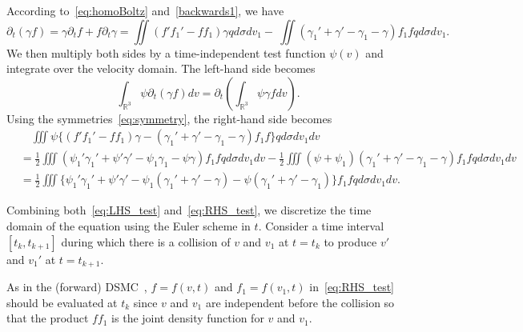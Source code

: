 \documentclass[times,final,nopreprintline]{elsarticle}
\newcommand{\bbR}{\mathbb R} \newcommand{\bbS}{\mathbb S}
\newcommand{\Rthree}{{\bbR^3}}
\begin{document}
According to~\eqref{eq:homoBoltz} and~\eqref{backwards1}, we have
\begin{equation*}
\partial_t (\gamma f) = \gamma \partial_t f + f \partial_t \gamma = \iint(f'f_1' - f f_1) \gamma qd\sigma dv_1 -  \ \iint (\gamma_1' + \gamma' - \gamma_1 -\gamma) f_1 f q  d\sigma dv_1. 
\end{equation*}
We then multiply both sides by a time-independent test function $\psi(v)$ and integrate over the velocity domain. The left-hand side becomes
\begin{equation}\label{eq:LHS_test}
\int_\Rthree \psi \partial_t (\gamma f) dv = \partial_t \left(  \int_\Rthree \psi \gamma f dv\right).
\end{equation}
Using the symmetries~\eqref{eq:symmetry}, the right-hand side becomes
\begin{align}
&\quad \iiint \psi \bigg\{(f'f_1' - f f_1) \gamma - (\gamma_1' + \gamma' - \gamma_1 -\gamma) f_1 f \bigg\} qd\sigma dv_1 dv \nonumber \\
&= \frac{1}{2} \iiint
\left(\psi_1'\gamma_1' + \psi'\gamma' -\psi_1\gamma_1 - \psi\gamma \right) f_1 f qd\sigma dv_1 dv  - \frac{1}{2} \iiint \left(\psi + \psi_1  \right)(\gamma_1' + \gamma' - \gamma_1 -\gamma) f_1 f qd\sigma dv_1 dv \nonumber \\
&= \frac{1}{2} \iiint \bigg\{ 
\psi_1'\gamma_1' + \psi'\gamma' - \psi_1(\gamma_1' + \gamma' -\gamma)
-\psi (\gamma_1' + \gamma' -\gamma_1)
\bigg\} f_1 f qd\sigma dv_1 dv \label{eq:RHS_test}.
\end{align}


Combining both~\eqref{eq:LHS_test} and~\eqref{eq:RHS_test}, we discretize the time domain of the equation using the Euler scheme in $t$. Consider a time interval $[t_k, t_{k+1}]$ during which there is a collision of $v$ and $v_1$ at $t=t_k$ to produce $v'$ and $v_1'$ at $t=t_{k+1}$.  

As in the (forward) DSMC~,   $f=f(v,t)$ and $f_1=f(v_1,t)$ in~\eqref{eq:RHS_test} should be evaluated at $t_k$ since $v$ and $v_1$ are independent before the collision so that the product $f f_1$ is the joint density function for $v$ and $v_1$. 
\end{document}
